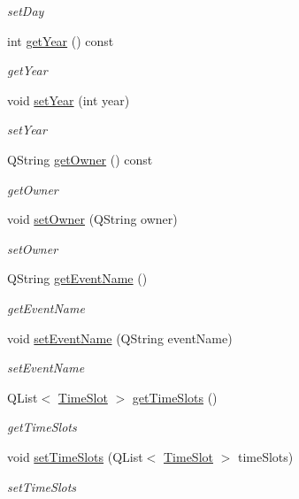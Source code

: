 \begin{DoxyCompactItemize}
\begin{DoxyCompactList}\small\item\em set\+Day \end{DoxyCompactList}\item 
int \hyperlink{class_event_a7ddd7775953aeeb58d311d52139c2844}{get\+Year} () const
\begin{DoxyCompactList}\small\item\em get\+Year \end{DoxyCompactList}\item 
void \hyperlink{class_event_adf16c1b8925ab210055ba0e3c05576d6}{set\+Year} (int year)
\begin{DoxyCompactList}\small\item\em set\+Year \end{DoxyCompactList}\item 
Q\+String \hyperlink{class_event_ab7e1dc08bd691aaf95ad994afdea6d2b}{get\+Owner} () const
\begin{DoxyCompactList}\small\item\em get\+Owner \end{DoxyCompactList}\item 
void \hyperlink{class_event_a4c5b75b1d4c162cb7489ee6a4ced8af0}{set\+Owner} (Q\+String owner)
\begin{DoxyCompactList}\small\item\em set\+Owner \end{DoxyCompactList}\item 
Q\+String \hyperlink{class_event_a2846f2dfad84c083d829fdf3d915c05a}{get\+Event\+Name} ()
\begin{DoxyCompactList}\small\item\em get\+Event\+Name \end{DoxyCompactList}\item 
void \hyperlink{class_event_a15b675acab68dd6a840421ec72aeef57}{set\+Event\+Name} (Q\+String event\+Name)
\begin{DoxyCompactList}\small\item\em set\+Event\+Name \end{DoxyCompactList}\item 
Q\+List$<$ \hyperlink{class_time_slot}{Time\+Slot} $>$ \hyperlink{class_event_a1d54b94176660fa89f06e47de4f38f91}{get\+Time\+Slots} ()
\begin{DoxyCompactList}\small\item\em get\+Time\+Slots \end{DoxyCompactList}\item 
void \hyperlink{class_event_a4e0b462c919ef361c1bce8aa6f806b77}{set\+Time\+Slots} (Q\+List$<$ \hyperlink{class_time_slot}{Time\+Slot} $>$ time\+Slots)
\begin{DoxyCompactList}\small\item\em set\+Time\+Slots \end{DoxyCompactList}\end{DoxyCompactItemize}


